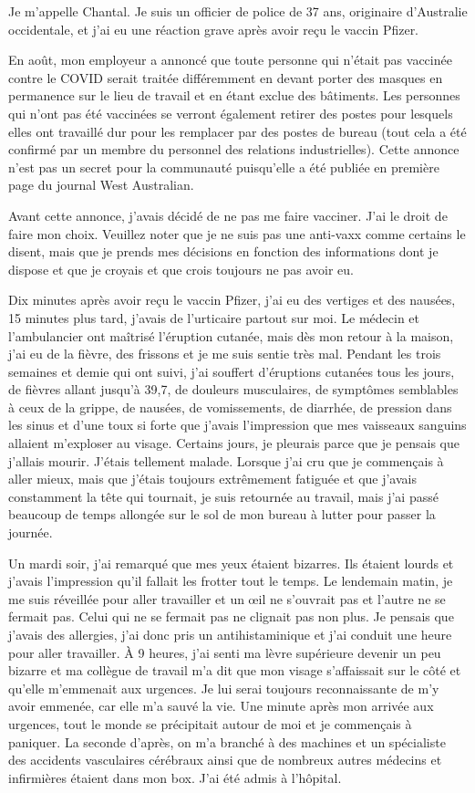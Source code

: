 Je m'appelle Chantal. Je suis un officier de police de 37 ans, originaire
d'Australie occidentale, et j'ai eu une réaction grave après avoir reçu le
vaccin Pfizer.

En août, mon employeur a annoncé que toute personne qui n'était pas vaccinée
contre le COVID serait traitée différemment en devant porter des masques en
permanence sur le lieu de travail et en étant exclue des bâtiments. Les
personnes qui n'ont pas été vaccinées se verront également retirer des postes
pour lesquels elles ont travaillé dur pour les remplacer par des postes de
bureau (tout cela a été confirmé par un membre du personnel des relations
industrielles). Cette annonce n'est pas un secret pour la communauté puisqu'elle
a été publiée en première page du journal West Australian.

Avant cette annonce, j'avais décidé de ne pas me faire vacciner. J'ai le droit
de faire mon choix. Veuillez noter que je ne suis pas une anti-vaxx comme
certains le disent, mais que je prends mes décisions en fonction des
informations dont je dispose et que je croyais et que crois toujours ne pas
avoir eu.

Dix minutes après avoir reçu le vaccin Pfizer, j'ai eu des vertiges et des
nausées, 15 minutes plus tard, j'avais de l'urticaire partout sur moi. Le
médecin et l'ambulancier ont maîtrisé l'éruption cutanée, mais dès mon retour à
la maison, j'ai eu de la fièvre, des frissons et je me suis sentie très
mal. Pendant les trois semaines et demie qui ont suivi, j'ai souffert
d'éruptions cutanées tous les jours, de fièvres allant jusqu'à 39,7, de douleurs
musculaires, de symptômes semblables à ceux de la grippe, de nausées, de
vomissements, de diarrhée, de pression dans les sinus et d'une toux si forte que
j'avais l'impression que mes vaisseaux sanguins allaient m'exploser au
visage. Certains jours, je pleurais parce que je pensais que j'allais
mourir. J'étais tellement malade. Lorsque j'ai cru que je commençais à aller
mieux, mais que j'étais toujours extrêmement fatiguée et que j'avais constamment
la tête qui tournait, je suis retournée au travail, mais j'ai passé beaucoup de
temps allongée sur le sol de mon bureau à lutter pour passer la journée.

Un mardi soir, j'ai remarqué que mes yeux étaient bizarres. Ils étaient lourds
et j'avais l'impression qu'il fallait les frotter tout le temps. Le lendemain
matin, je me suis réveillée pour aller travailler et un œil ne s'ouvrait pas et
l'autre ne se fermait pas. Celui qui ne se fermait pas ne clignait pas non
plus. Je pensais que j'avais des allergies, j'ai donc pris un antihistaminique
et j'ai conduit une heure pour aller travailler. À 9 heures, j'ai senti ma lèvre
supérieure devenir un peu bizarre et ma collègue de travail m'a dit que mon
visage s'affaissait sur le côté et qu'elle m'emmenait aux urgences. Je lui serai
toujours reconnaissante de m'y avoir emmenée, car elle m'a sauvé la vie. Une
minute après mon arrivée aux urgences, tout le monde se précipitait autour de
moi et je commençais à paniquer. La seconde d'après, on m'a branché à des
machines et un spécialiste des accidents vasculaires cérébraux ainsi que de
nombreux autres médecins et infirmières étaient dans mon box. J'ai été admis à
l'hôpital.

